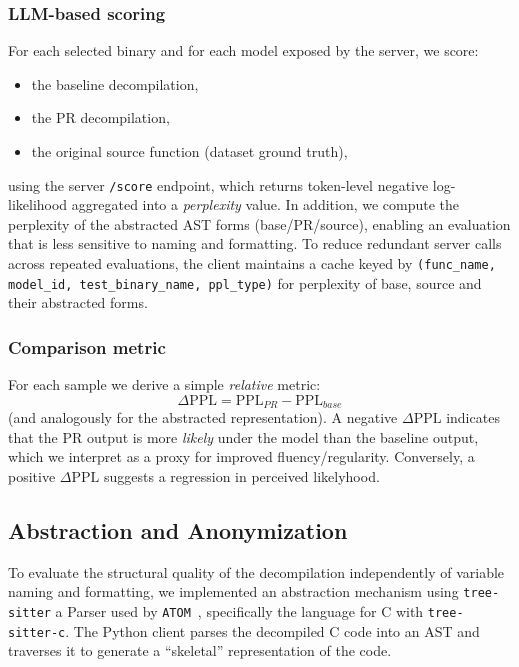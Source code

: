 \subsubsection{LLM-based scoring}
For each selected binary and for each model exposed by the server, we score:
\begin{itemize}
    \item the baseline decompilation,
    \item the \ac{PR} decompilation,
    \item the original source function (dataset ground truth),
\end{itemize}
using the server \texttt{/score} endpoint, which returns token-level negative log-likelihood aggregated into a \emph{perplexity} value. 
In addition, we compute the perplexity of the abstracted \ac{AST} forms (base/\ac{PR}/source), enabling an evaluation that is less sensitive to naming and formatting. 
To reduce redundant server calls across repeated evaluations, the client maintains a cache keyed by \texttt{(func\_name, model\_id, test\_binary\_name, ppl\_type)} for perplexity of base, source and their abstracted forms.

\subsubsection{Comparison metric}
For each sample we derive a simple \emph{relative} metric:
\[
\Delta\mathrm{PPL} = \mathrm{PPL}_{PR} - \mathrm{PPL}_{base}
\]
(and analogously for the abstracted representation). A negative $\Delta\mathrm{PPL}$ indicates that the \ac{PR} output is more \emph{likely} under the model than the baseline output, 
which we interpret as a proxy for improved fluency/regularity. Conversely, a positive $\Delta\mathrm{PPL}$ suggests a regression in perceived likelyhood.

\subsection{Abstraction and Anonymization}\label{sec:anonim}
To evaluate the structural quality of the decompilation independently of variable naming and formatting, we implemented an abstraction mechanism using \texttt{tree-sitter} a 
Parser used by \texttt{ATOM}~\cite{site:wikipediaAtomtext}, specifically the language for C with \texttt{tree-sitter-c}.
The Python client parses the decompiled C code into an \ac{AST} and traverses it to generate a ``skeletal'' representation of the code.

